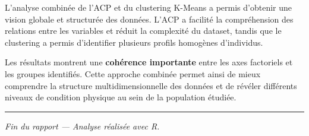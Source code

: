 \documentclass[
]{article}
\begin{document}
L'analyse combinée de l'ACP et du clustering K-Means a permis d'obtenir
une vision globale et structurée des données. L'ACP a facilité la
compréhension des relations entre les variables et réduit la complexité
du dataset, tandis que le clustering a permis d'identifier plusieurs
profils homogènes d'individus.

Les résultats montrent une \textbf{cohérence importante} entre les axes
factoriels et les groupes identifiés. Cette approche combinée permet
ainsi de mieux comprendre la structure multidimensionnelle des données
et de révéler différents niveaux de condition physique au sein de la
population étudiée.

\begin{center}\rule{0.5\linewidth}{0.5pt}\end{center}

\emph{Fin du rapport --- Analyse réalisée avec R.}
\end{document}
